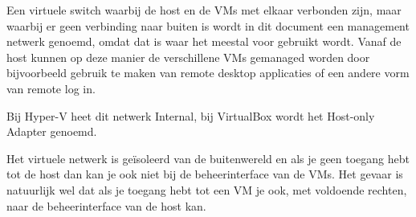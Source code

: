 Een virtuele switch waarbij de host en de VMs met elkaar verbonden zijn, maar waarbij er geen verbinding naar buiten is wordt in dit document een management netwerk genoemd, omdat dat is waar het meestal voor gebruikt wordt. Vanaf de host kunnen op deze manier de verschillene VMs gemanaged worden door bijvoorbeeld gebruik te maken van remote desktop applicaties of een andere vorm van remote log
in.

Bij Hyper-V heet dit netwerk Internal, bij VirtualBox wordt het Host-only Adapter genoemd.

Het virtuele netwerk is ge\"isoleerd van de buitenwereld en als je geen toegang hebt tot de host dan kan je ook niet bij de beheerinterface van de VMs. Het gevaar is natuurlijk wel dat als je toegang hebt tot een VM je ook, met voldoende rechten, naar de beheerinterface van de host kan.
